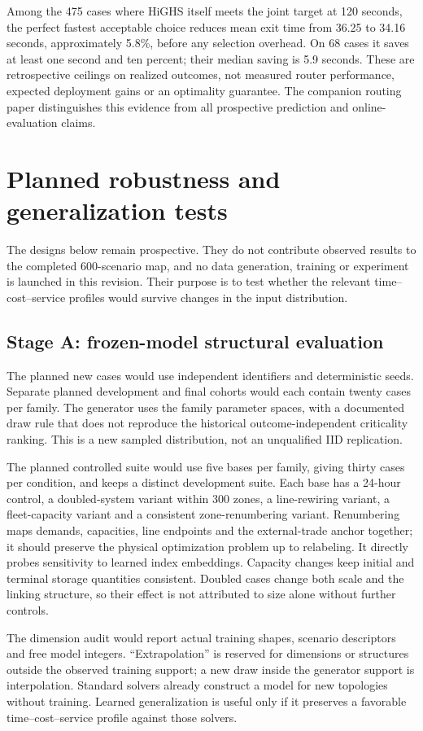 Among the 475 cases where HiGHS itself meets the joint target at 120 seconds,
the perfect fastest acceptable choice reduces mean exit time from 36.25 to
34.16 seconds, approximately 5.8\%, before any selection overhead. On 68 cases
it saves at least one second and ten percent; their median saving is 5.9
seconds. These are retrospective ceilings on realized outcomes, not measured
router performance, expected deployment gains or an optimality guarantee.
The companion routing paper distinguishes this evidence from all prospective
prediction and online-evaluation claims.

\section{Planned robustness and generalization tests}
The designs below remain prospective. They do not contribute observed results
to the completed 600-scenario map, and no data generation, training or experiment is
launched in this revision. Their purpose is to test whether the relevant
time--cost--service profiles would survive changes in the input distribution.
\subsection{Stage A: frozen-model structural evaluation}
The planned new cases would use independent identifiers and deterministic seeds. Separate
planned development and final cohorts would each contain twenty cases per family. The
generator uses the family parameter spaces, with a documented draw rule that
does not reproduce the historical outcome-independent criticality ranking.
This is a new sampled distribution, not an unqualified IID replication.

The planned controlled suite would use five bases per family, giving thirty cases per
condition, and keeps a distinct development suite. Each base has a 24-hour
control, a doubled-system variant within 300 zones, a line-rewiring variant,
a fleet-capacity variant and a consistent zone-renumbering variant. Renumbering
maps demands, capacities, line endpoints and the external-trade anchor together;
it should preserve the physical optimization problem up to relabeling. It
directly probes sensitivity to learned index embeddings. Capacity changes keep
initial and terminal storage quantities consistent. Doubled cases change both
scale and the linking structure, so their effect is not attributed to size
alone without further controls.

The dimension audit would report actual training shapes, scenario descriptors and
free model integers. ``Extrapolation'' is reserved for dimensions or structures
outside the observed training support; a new draw inside the generator support
is interpolation. Standard solvers already construct a model for new topologies
without training. Learned generalization is useful only if it preserves a
favorable time--cost--service profile against those solvers.

